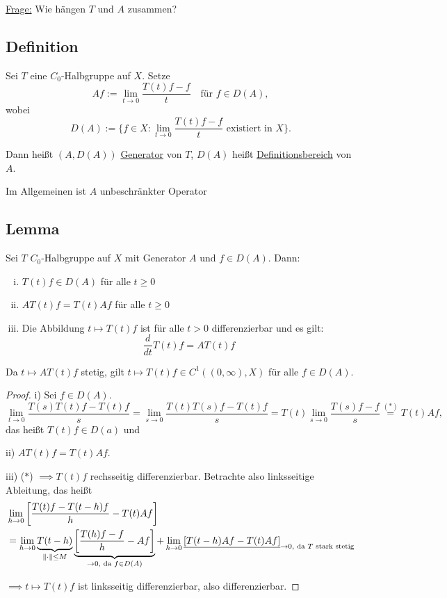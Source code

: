 \underline{Frage:} Wie hängen $T$ und $A$ zusammen?

\subsection{Definition}

Sei $T$ eine $C_0$-Halbgruppe auf $X$. Setze
$$
Af := \lim_{t \to 0} \frac{T(t) f - f}{t} \quad\text{für } f \in D(A),
$$
wobei
$$
D(A) := \{ f \in X \colon \lim_{t \to 0} \frac{T(t) f - f}{t} \text{ existiert in } X\}.
$$

Dann heißt $(A, D(A))$ \underline{Generator} von $T$, $D(A)$ heißt \underline{Definitionsbereich} von $A$.

\begin{bem}
  Im Allgemeinen ist $A$ unbeschränkter Operator
\end{bem}

\subsection{Lemma}

Sei $T$ $C_0$-Halbgruppe auf $X$ mit Generator $A$ und $f \in D(A)$. Dann:
\begin{enumerate}[i)]
  \item $T(t) f \in D(A)$ für alle $t \geq 0$
  \item $AT(t) f = T(t) A f$ für alle $t \geq 0$
  \item Die Abbildung $t \mapsto T(t) f $ ist für alle $t > 0$ differenzierbar und es gilt:
  $$
    \frac{d}{dt} T(t) f = A T(t) f 
  $$
\end{enumerate}

\begin{bem}
  Da $t \mapsto AT(t) f$ stetig, gilt $t \mapsto T(t) f \in C^1((0,\infty), X)$ für alle $f \in D(A)$.
\end{bem}

\begin{proof}
i) Sei $f \in D(A)$.
$$
\lim_{t \to 0} \frac{T(s)T(t) f - T(t) f}{s} = \lim_{s \to 0} \frac{T(t)T(s) f - T(t) f}{s} = T(t) \lim_{s \to 0} \frac{T(s)f - f}{s} \overset{(\ast)}{=} T(t)A f,
$$
das heißt $T(t) f \in D(a)$ und

ii) $AT(t) f = T(t) Af$.

iii) ($\ast$) $\implies T(t) f$ rechsseitig differenzierbar. Betrachte also linksseitige Ableitung, das heißt
\begin{align*}
&\lim_{h \to 0} \left[\frac{T(t)f - T(t - h)f}{h} - T(t) Af \right] \\
&= \lim_{h \to 0} \underbrace{T(t - h)}_{\lVert \cdot \rVert \leq M} \underbrace{\left[\frac{T(h) f - f}{h} - Af \right]}_{\to 0, \text{ da } f \in D(A)} 
+ \lim_{h \to 0} \underline{\left[ T(t - h) Af - T(t) Af \right]}_{\to 0, \text{ da } T \text{ stark stetig}}
\end{align*}

$\implies t \mapsto T(t) f$ ist linksseitig differenzierbar, also differenzierbar.
\end{proof}

